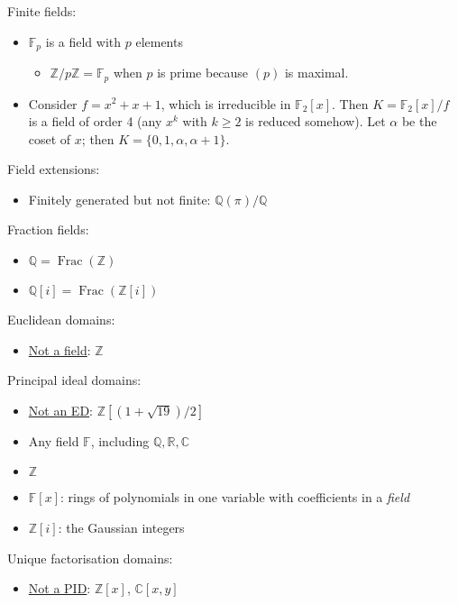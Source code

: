 Finite fields:
    \begin{itemize}
        \item $\mathbb{F}_p$ is a field with $p$ elements
            \begin{itemize}
                \item $\mathbb{Z}/p\mathbb{Z} = \mathbb{F}_p$ when $p$ is prime because $(p)$ is maximal.
            \end{itemize}
        \item Consider $f = x^2 + x + 1$, which is irreducible in $\mathbb{F}_2[x]$. Then $K = \mathbb{F}_2[x]/f$ is a field of order 4 (any $x^k$ with $k \geq 2$ is reduced somehow). Let $\alpha$ be the coset of $x$; then $K = \{ 0, 1, \alpha, \alpha + 1 \}$.
    \end{itemize}
    
Field extensions:
    \begin{itemize}
        \item Finitely generated but not finite: $\mathbb{Q}(\pi)/\mathbb{Q}$
    \end{itemize}
    
Fraction fields:
    \begin{itemize}
        \item $\mathbb{Q} = \operatorname{Frac}(\mathbb{Z})$
        \item $\mathbb{Q}[i] = \operatorname{Frac}(\mathbb{Z}[i])$
    \end{itemize}

Euclidean domains:
    \begin{itemize}
        \item \underline{Not a field}: $\mathbb{Z}$
    \end{itemize}

Principal ideal domains:
    \begin{itemize}
        \item \underline{Not an ED}: $\mathbb{Z}[(1 + \sqrt{19}) / 2]$
        \item Any field $\mathbb{F}$, including $\mathbb{Q}, \mathbb{R}, \mathbb{C}$
        \item $\mathbb{Z}$
        \item $\mathbb{F}[x]$: rings of polynomials in one variable with coefficients in a \textit{field}
        \item $\mathbb{Z}[i]$: the Gaussian integers
    \end{itemize}
    
Unique factorisation domains:
    \begin{itemize}
        \item \underline{Not a PID}: $\mathbb{Z}[x]$, $\mathbb{C}[x, y]$
    \end{itemize}
    
